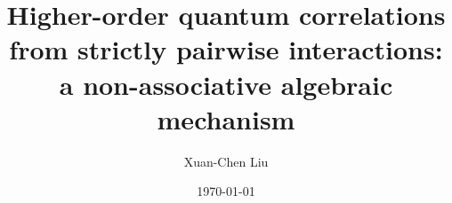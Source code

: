 \documentclass[aps,physrev,preprint,groupedaddress]{revtex4-2}
\begin{document}

\title{Higher-order quantum correlations from strictly pairwise interactions: a non-associative algebraic mechanism}


\author{Xuan-Chen Liu}


\date{\today}
\end{document}

